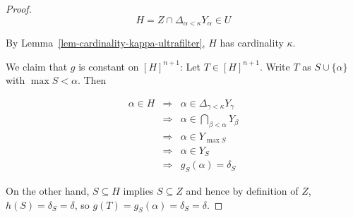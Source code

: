 \begin{proof}
\begin{equation}
H = Z \cap \Delta_{\alpha < \kappa} Y_\alpha \in U
\end{equation}

By Lemma~\ref{lem-cardinality-kappa-ultrafilter}, $H$ has cardinality $\kappa$.

We claim that $g$ is constant on $[H]^{n+1}$: Let $T \in [H]^{n+1}$. Write $T$ as $S \cup \{\alpha\}$ with $\max S < \alpha$. Then

\begin{align*}
    \alpha \in H & \Rightarrow  & \alpha \in \Delta_{\gamma < \kappa} Y_\gamma \\
                 & \Rightarrow  & \alpha \in \bigcap_{\beta < \alpha} Y_\beta \\
                 & \Rightarrow  & \alpha \in Y_{\max S} \\
                 & \Rightarrow  & \alpha \in Y_S \\
                 & \Rightarrow  & g_S(\alpha) = \delta_S
\end{align*}

On the other hand, $S \subseteq H$ implies $S \subseteq Z$ and hence by definition of $Z$, $h(S) = \delta_S = \delta$, so $g(T) = g_S(\alpha) = \delta_S = \delta$.

\end{proof}